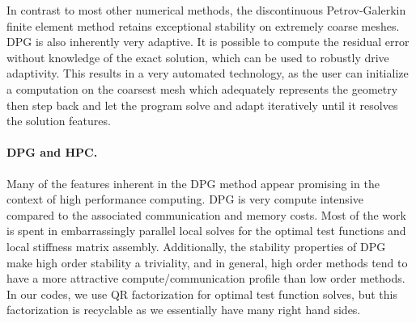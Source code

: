 \documentclass[letterpaper]{article}
\begin{document}
In contrast to most other numerical methods, the discontinuous Petrov-Galerkin finite element method retains exceptional stability on extremely coarse meshes.
DPG is also inherently very adaptive.
It is possible to compute the residual error without knowledge of the exact solution, which can be used to robustly drive adaptivity.
This results in a very automated technology, as the user can initialize a computation on the coarsest mesh which adequately represents the geometry 
then step back and let the program solve and adapt iteratively until it resolves the solution features.

\paragraph{DPG and HPC.}
Many of the features inherent in the DPG method appear promising in the context of high performance computing.
DPG is very compute intensive compared to the associated communication and memory costs.
Most of the work is spent in embarrassingly parallel local solves for the optimal test functions and local stiffness matrix assembly.
Additionally, the stability properties of DPG make high order stability a triviality, and in general, 
high order methods tend to have a more attractive compute/communication profile than low order methods.
In our codes, we use QR factorization for optimal test function solves, but this factorization is recyclable as we essentially have many right hand sides.
\end{document}
